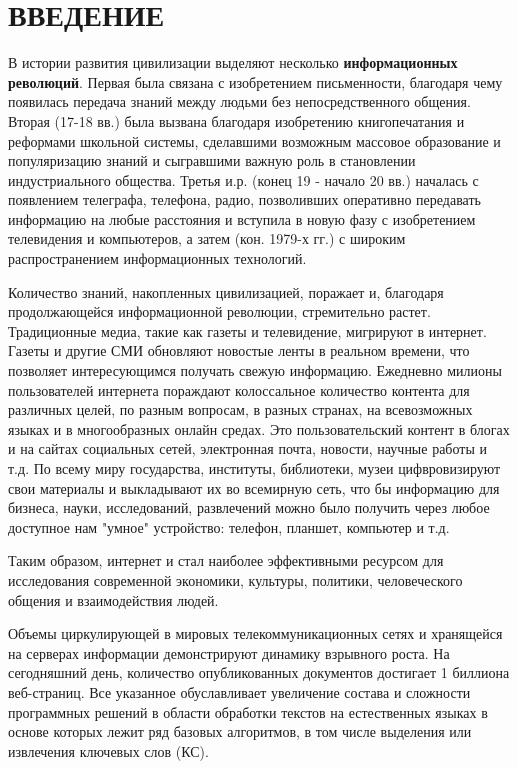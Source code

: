 \chapter*{ВВЕДЕНИЕ}

В истории развития цивилизации выделяют несколько \textbf{информационных революций}.
Первая была связана с изобретением письменности, благодаря чему появилась передача знаний между людьми без непосредственного общения.
Вторая (17-18 вв.) была вызвана благодаря изобретению книгопечатания и реформами школьной системы, сделавшими возможным массовое образование и популяризацию знаний и сыгравшими важную роль в становлении индустриального общества.
Третья и.р. (конец 19 - начало 20 вв.) началась с появлением телеграфа, телефона, радио, позволивших оперативно передавать информацию на любые расстояния и вступила в новую фазу с изобретением телевидения и компьютеров, а затем (кон. 1979-х гг.) с широким распространением информационных технологий. \cite{16}

Количество знаний, накопленных цивилизацией, поражает и, благодаря продолжающейся информационной революции, стремительно растет.
Традиционные медиа, такие как газеты и телевидение, мигрируют в интернет.
Газеты и другие СМИ обновляют новостые ленты в реальном времени, что позволяет интересующимся получать свежую информацию.
Ежедневно милионы пользователей интернета пораждают колоссальное количество контента для различных целей, по разным вопросам, в разных странах, на всевозможных языках и в многообразных онлайн средах.
Это пользовательский контент в блогах и на сайтах социальных сетей, электронная почта, новости, научные работы и т.д.
По всему миру государства, институты, библиотеки, музеи цифвровизируют свои материалы и выкладывают их во всемирную сеть, что бы информацию для бизнеса, науки, исследований, развлечений можно было получить через любое доступное нам "умное" устройство: телефон, планшет, компьютер и т.д. \cite{2}

Таким образом, интернет и стал наиболее эффективными ресурсом для исследования современной экономики, культуры, политики, человеческого общения и взаимодействия людей. \cite{2}

Объемы циркулирующей в мировых телекоммуникационных сетях и хранящейся на серверах информации демонстрируют динамику взрывного роста.
На сегодняшний день, количество опубликованных документов достигает 1 биллиона веб-страниц.
Все указанное обуславливает увеличение состава и сложности программных решений в области обработки текстов на естественных языках в основе которых лежит ряд базовых алгоритмов, в том числе выделения или извлечения ключевых слов (КС).

